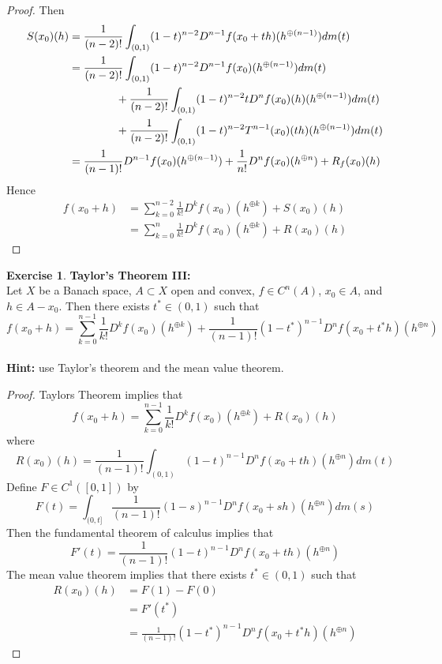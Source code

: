 \documentclass[12pt]{amsart}
\theoremstyle{definition}
\newtheorem{ex}[definition]{Exercise}
\newcommand{\tbf}[1]{\textbf{#1}}
\DeclareMathOperator*{\0}{\mbf{0}}
\DeclareMathOperator*{\1}{\mbf{1}}
\newcommand{\lex}[1]{\label{ex:#1}}
\begin{document}
\begin{proof}
	Then 
	\begin{align*}
	S(x_0)(h) 
	&= \frac{1}{(n-2)!}\int_{(0,1)} (1-t)^{n-2}D^{n-1}f(x_0 + th)(h^{\oplus (n-1)})d m(t) \\
	&= \frac{1}{(n-2)!}\int_{(0,1)} (1-t)^{n-2} D^{n-1}f(x_0)(h^{\oplus (n-1)}) dm(t) \\ 
	& \hspace{1.5cm} + \frac{1}{(n-2)!} \int_{(0,1)} (1-t)^{n-2}t D^{n}f(x_0)(h)(h^{\oplus (n-1)}) dm(t) \\
	& \hspace{1.5cm} + \frac{1}{(n-2)!} \int_{(0,1)} (1-t)^{n-2}T^{n-1}(x_0)(th)(h^{\oplus (n-1)}) dm(t) \\
	&= \frac{1}{(n-1)!}D^{n-1}f(x_0)(h^{\oplus (n-1)}) + \frac{1}{n!}D^{n}f(x_0)(h^{\oplus n}) + R_f(x_0)(h)
	\end{align*}
	Hence 
	\begin{align*}
	f(x_0 + h) 
	&= \sum_{k=0}^{n-2} \frac{1}{k!} D^k f(x_0)(h^{\oplus k}) + S(x_0)(h) \\
	&= \sum_{k=0}^{n} \frac{1}{k!} D^k f(x_0)(h^{\oplus k}) + R(x_0)(h) 
	\end{align*}
	
	\end{proof}
	
	
	\begin{ex} \lex{} \tbf{Taylor's Theorem III:}\\
	Let $X$ be a Banach space, $A \subset X$ open and convex, $f \in C^{n}(A)$, $x_0 \in A$, and $h \in A - x_0$. Then there exists $t^* \in (0,1)$ such that $$f(x_0 + h) = \sum_{k=0}^{n-1} \frac{1}{k!} D^k f(x_0)(h^{\oplus k}) + \frac{1}{(n-1)!} (1-t^*)^{n-1}D^{n}f(x_0 + t^*h)(h^{\oplus n})$$ \\
	\tbf{Hint:} use Taylor's theorem and the mean value theorem.
	\end{ex}	
	
	\begin{proof}
	Taylors Theorem implies that 
	$$f(x_0 + h) = \sum_{k=0}^{n-1} \frac{1}{k!} D^k f(x_0)(h^{\oplus k}) + R(x_0)(h)$$ 
	where 
	$$R(x_0)(h) =  \frac{1}{(n-1)!}\int_{(0,1)} (1-t)^{n-1}D^{n}f(x_0 + th)(h^{\oplus n})d m(t)$$ 
	Define $F \in C^1([0,1])$ by $$F(t) = \int_{(0,t]}\frac{1}{(n-1)!}(1-s)^{n-1}D^{n}f(x_0 + sh)(h^{\oplus n})d m(s)$$ Then the fundamental theorem of calculus implies that 
	$$F'(t) = \frac{1}{(n-1)!}(1-t)^{n-1}D^{n}f(x_0 + th)(h^{\oplus n})$$ 
	The mean value theorem implies that there exists $t^* \in (0,1)$ such that 
	\begin{align*}
	R(x_0)(h)
	&= F(1) - F(0) \\
	&= F'(t^*) \\
	&= \frac{1}{(n-1)!}(1-t^*)^{n-1}D^{n}f(x_0 + t^*h)(h^{\oplus n})
	\end{align*}
	\end{proof}	
\end{document}
